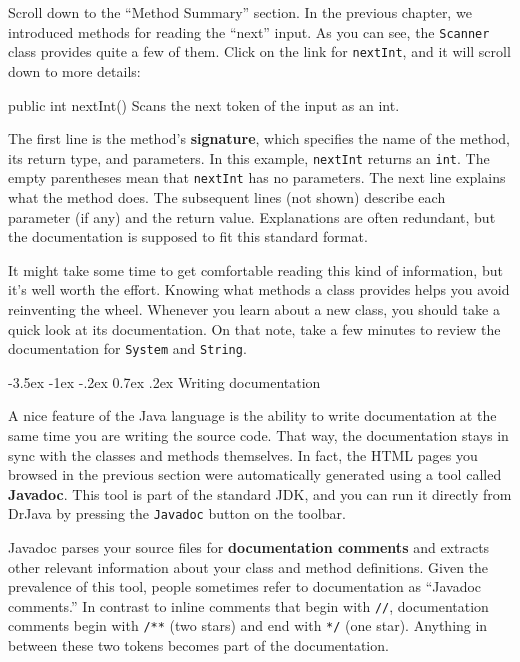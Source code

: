 \documentclass[12pt]{book}
\makeatletter
\theoremstyle{exercise}
\newcommand{\java}[1]{\verb"#1"}
\renewcommand{\section}{\@startsection{section}{1}{\z@}%
    {-3.5ex \@plus -1ex \@minus -.2ex}%
    {0.7ex \@plus.2ex}%
    {\normalfont\Large\bfseries}}
\newcommand{\java}[1]{\lstinline{#1}} %
\makeatother
\begin{document}
Scroll down to the ``Method Summary'' section.
In the previous chapter, we introduced methods for reading the ``next'' input.
As you can see, the \java{Scanner} class provides quite a few of them.
Click on the link for \java{nextInt}, and it will scroll down to more details:

\begin{stdout}
public int nextInt()
Scans the next token of the input as an int.
\end{stdout}


The first line is the method's {\bf signature}, which specifies the name of the method, its return type, and parameters.
In this example, \java{nextInt} returns an \java{int}.
The empty parentheses mean that \java{nextInt} has no parameters.
The next line explains what the method does.
The subsequent lines (not shown) describe each parameter (if any) and the return value.
Explanations are often redundant, but the documentation is supposed to fit this standard format.

It might take some time to get comfortable reading this kind of information, but it's well worth the effort.
Knowing what methods a class provides helps you avoid reinventing the wheel.
Whenever you learn about a new class, you should take a quick look at its documentation.
On that note, take a few minutes to review the documentation for \java{System} and \java{String}.


\section{Writing documentation}


A nice feature of the Java language is the ability to write documentation at the same time you are writing the source code.
That way, the documentation stays in sync with the classes and methods themselves.
In fact, the HTML pages you browsed in the previous section were automatically generated using a tool called {\bf Javadoc}.
This tool is part of the standard JDK, and you can run it directly from DrJava by pressing the {\tt Javadoc} button on the toolbar.


Javadoc parses your source files for {\bf documentation comments} and extracts other relevant information about your class and method definitions.
Given the prevalence of this tool, people sometimes refer to documentation as ``Javadoc comments.''
In contrast to inline comments that begin with \java{//}, documentation comments begin with \java{/**} (two stars) and end with \java{*/} (one star).
Anything in between these two tokens becomes part of the documentation.
\end{document}
